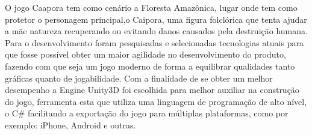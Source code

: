 O jogo Caapora tem como cenário a Floresta Amazônica, lugar onde tem como protetor o personagem principal,o Caipora, uma figura folclórica que tenta ajudar a mãe natureza recuperando ou evitando danos causados pela destruição humana.
Para o desenvolvimento foram pesquisadas e selecionadas tecnologias atuais para que fosse possível obter um maior agilidade no desenvolvimento do produto, fazendo com que seja um jogo moderno de forma a equilibrar qualidades tanto gráficas quanto de jogabilidade. Com a finalidade de se obter um melhor desempenho a Engine Unity3D foi escolhida para melhor auxiliar na construção do jogo, ferramenta esta que utiliza uma linguagem de programação de alto nível, o C\# facilitando a exportação do jogo para múltiplas plataformas, como por exemplo: iPhone, Android e outras.

